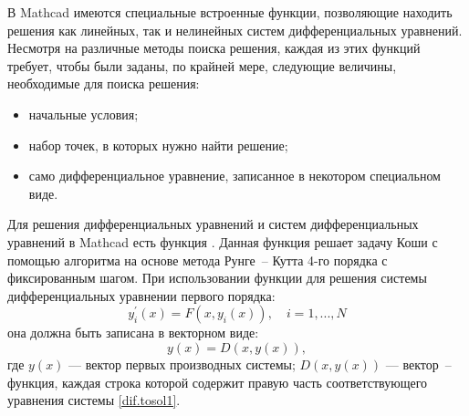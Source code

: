 В Mathcad имеются специальные встроенные функции, позволяющие находить решения как линейных, так и нелинейных систем дифференциальных уравнений. Несмотря на различные методы поиска решения, каждая из этих функций требует, чтобы были заданы, по крайней мере, следующие величины, необходимые для поиска решения:
\begin{itemize}
	\item начальные условия; 
	\item набор точек, в которых нужно найти решение;
	\item само дифференциальное уравнение, записанное в некотором специальном виде.
\end{itemize}

Для решения дифференциальных уравнений и систем дифференциальных уравнений в Mathcad есть функция . Данная функция решает задачу Коши с помощью алгоритма на основе метода Рунге~-- Кутта 4-го порядка с фиксированным шагом.
При использовании функции  для решения системы дифференциальных уравнении первого порядка:
\begin{equation}\label{dif.tosol1}
y_i^{\prime}(x)=F(x,y_i(x)),\quad i=1, ... ,N
\end{equation}
она должна быть записана в векторном виде:
\begin{equation}\label{dif.tosol2}
y(x)=D(x,y(x)),
\end{equation}
где $y(x)$ --- вектор первых производных системы; $D(x,y(x))$ --- вектор~-- функция, каждая строка которой содержит правую часть соответствующего уравнения системы \ref{dif.tosol1}.

